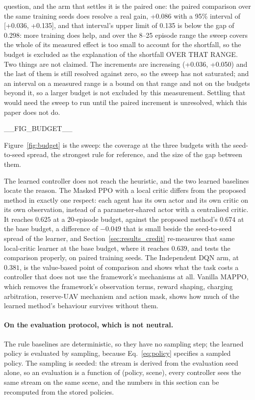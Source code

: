 question, and the arm that settles it is the paired one: the paired comparison over the same training seeds does resolve a real gain, +0.086 with a 95\% interval of [+0.036, +0.135], and that interval's upper limit of 0.135 is below the gap of 0.298: more training does help, and over the 8--25 episode range the sweep covers the whole of its measured effect is too small to account for the shortfall, so the budget is excluded as the explanation of the shortfall OVER THAT RANGE.  Two things are not claimed.  The increments are increasing (+0.036, +0.050) and the last of them is still resolved against zero, so the sweep has not saturated; and an interval on a measured range is a bound on that range and not on the budgets beyond it, so a larger budget is not excluded by this measurement.  Settling that would need the sweep to run until the paired increment is unresolved, which this paper does not do.

__FIG_BUDGET__

Figure~\ref{fig:budget} is the sweep: the coverage at the three budgets with the seed-to-seed spread, the strongest rule for reference, and the size of the gap between them.

The learned controller does not reach the heuristic, and the two learned
baselines locate the reason.  The Masked PPO with a local critic differs
from the proposed method in exactly one respect: each agent has its own
actor and its own critic on its own observation, instead of a
parameter-shared actor with a centralised critic.  It reaches
$0.625$ at a $20$-episode budget, against the proposed
method's $0.674$ at the base budget, a difference
of $-0.049$ that is small beside the seed-to-seed spread of the
learner, and Section~\ref{sec:results_credit} re-measures that same
local-critic learner at the base budget, where it reaches
$0.639$, and tests the comparison properly, on paired training
seeds.  The Independent DQN arm, at
$0.381$, is the value-based point of comparison and shows what the
task costs a controller that does not use the framework's mechanisms at
all.  Vanilla MAPPO, which removes the
framework's observation terms, reward shaping, charging arbitration,
reserve-UAV mechanism and action mask, shows how much of the learned
method's behaviour survives without them.

\paragraph{On the evaluation protocol, which is not neutral.} The rule
baselines are deterministic, so they have no sampling step; the learned
policy is evaluated by sampling, because Eq.~\eqref{eq:policy} specifies a
sampled policy.  The sampling is seeded: the stream is derived from the
evaluation seed alone, so an evaluation is a function of (policy, scene),
every controller sees the same stream on the same scene, and the numbers in
this section can be recomputed from the stored policies.

